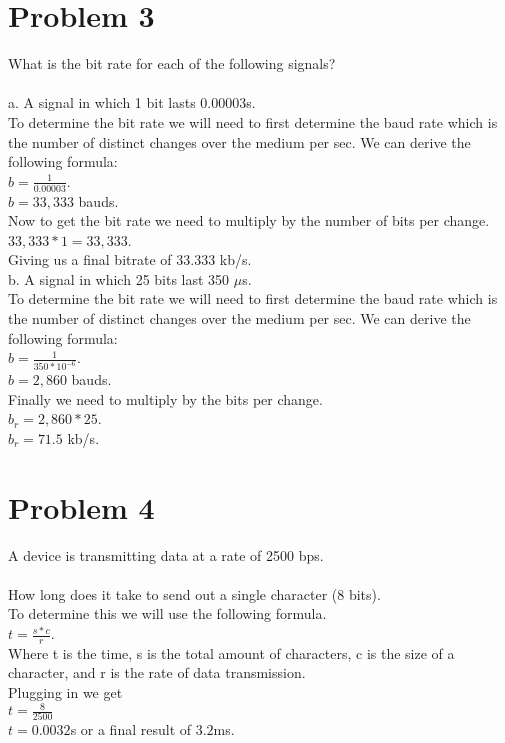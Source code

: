 \documentclass{article}
\begin{document}
\section*{Problem 3} %
What is the bit rate for each of the following signals?\\\\
\hspace{20mm}a. A signal in which 1 bit lasts 0.00003s.\\
To determine the bit rate we will need to first determine the baud rate which is the number of distinct changes over the medium 
per sec. We can derive the following formula:\\
$b = \frac{1}{0.00003}$.\\
$b = 33,333$ bauds.\\
Now to get the bit rate we need to multiply by the number of bits per change.\\
$33,333 * 1 = 33,333$.\\
Giving us a final bitrate of 33.333 kb/s.\\
\hspace{20mm}b. A signal in which 25 bits last 350 $\mu$s.\\
To determine the bit rate we will need to first determine the baud rate which is the number of distinct changes over the medium 
per sec. We can derive the following formula:\\
$b = \frac{1}{350 * 10^{-6}}$.\\
$b = 2,860$ bauds.\\
Finally we need to multiply by the bits per change.\\
$b_{r} = 2,860 * 25$.\\
$b_{r} = 71.5$ kb/s.\\

\section*{Problem 4} %
A device is transmitting data at a rate of 2500 bps.\\\\
\subP How long does it take to send out a single character (8 bits).\\
To determine this we will use the following formula.\\
$t = \frac{s*c}{r}$.\\
Where t is the time, s is the total amount of characters, c is the size of a character,
and r is the rate of data transmission.\\
Plugging in we get\\
$t = \frac{8}{2500}$\\
$t = 0.0032$s
or a final result of $3.2$ms.\\\\
\end{document}
